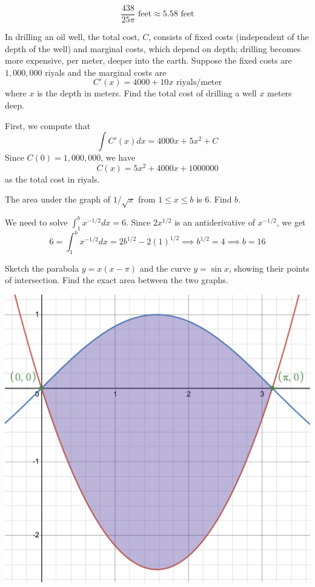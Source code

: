 \documentclass[11pt]{exam}
\begin{document}
\begin{questions}
\begin{solution}
\[        \frac{438}{25 \pi} \text{ feet} \approx 5.58 \text{ feet}
      \]
    \end{solution}
  \question In drilling an oil well, the total cost, \(C\), consists
    of fixed costs (independent of the depth of the well) and marginal
    costs, which depend on depth; drilling becomes more expensive, per
    meter, deeper into the earth. Suppose the fixed costs are
    \(1,000,000\) riyals and the marginal costs are \[
      C'(x) = 4000 + 10x \text{ riyals/meter}
    \]
    where \(x\) is the depth in meters. Find the total cost of
    drilling a well \(x\) meters deep.
    \begin{solution}
      First, we compute that \[
        \int C'(x) dx = 4000x + 5 x^2 + C
      \]
      Since \(C(0) = 1,000,000\), we have \[
        C(x) = 5x^2 + 4000x + 1000000
      \]
      as the total cost in riyals.
    \end{solution}
  \question The area under the graph of $1/\sqrt{x}$ from $1\leq x \leq b$ is 6.  Find $b$.
    \begin{solution}
      We need to solve \(\int_1^b x^{-1/2} dx = 6\). Since \(2
      x^{1/2}\) is an antiderivative of \(x^{-1/2}\), we get \[
        6 = \int_1^b x^{-1/2} dx = 2 b^{1/2} - 2(1)^{1/2} \implies
        b^{1/2} = 4 \implies b = 16
      \]
    \end{solution}
  \question Sketch the parabola \(y=x(x-\pi)\) and the curve \(y=\sin
    x\), showing their points of intersection. Find the exact area
    between the two graphs.
    \begin{solution}
      \includegraphics[scale=0.5]{9}


\end{solution}
\end{questions}
\end{document}
